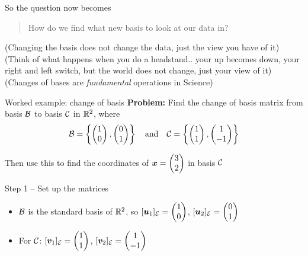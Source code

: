 \documentclass[aspectratio=169]{beamer}\usepackage[]{graphicx}\usepackage[]{xcolor}
\begin{document}
\begin{frame}
So the question now becomes
\begin{quote}
How do we find what new basis to look at our data in?
\end{quote}
\vfill
(Changing the basis does not change the data, just the view you have of it)
\vfill
(Think of what happens when you do a headstand.. your up becomes down, your right and left switch, but the world does not change, just your view of it)
\vfill
(Changes of bases are \emph{fundamental} operations in Science)
\end{frame}








\begin{frame}{Worked example: change of basis}
\textbf{Problem:} Find the change of basis matrix from basis $\mathcal{B}$ to basis $\mathcal{C}$ in $\mathbb{R}^2$, where
$$\mathcal{B} = \left\{\begin{pmatrix} 1 \\ 0 \end{pmatrix}, \begin{pmatrix} 0 \\ 1 \end{pmatrix}\right\} \quad \text{and} \quad \mathcal{C} = \left\{\begin{pmatrix} 1 \\ 1 \end{pmatrix}, \begin{pmatrix} 1 \\ -1 \end{pmatrix}\right\}$$

\vfill
Then use this to find the coordinates of $\bm{x} = \begin{pmatrix} 3 \\ 2 \end{pmatrix}$ in basis $\mathcal{C}$
\end{frame}

\begin{frame}{Step 1 -- Set up the matrices}
\begin{itemize}
\item $\mathcal{B}$ is the standard basis of $\mathbb{R}^2$, so $[\bm{u}_1]_{\mathcal{E}} = \begin{pmatrix} 1 \\ 0 \end{pmatrix}$, $[\bm{u}_2]_{\mathcal{E}} = \begin{pmatrix} 0 \\ 1 \end{pmatrix}$
\item For $\mathcal{C}$: $[\bm{v}_1]_{\mathcal{E}} = \begin{pmatrix} 1 \\ 1 \end{pmatrix}$, $[\bm{v}_2]_{\mathcal{E}} = \begin{pmatrix} 1 \\ -1 \end{pmatrix}$
\end{itemize}
\end{frame}
\end{document}
